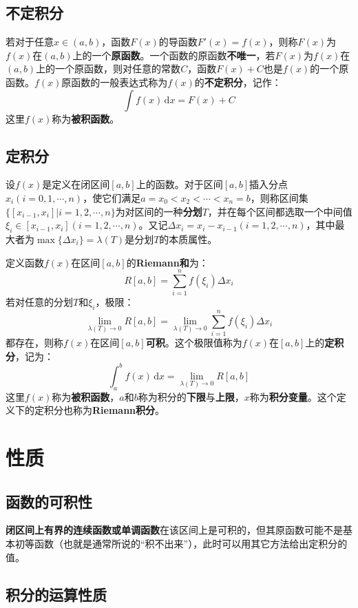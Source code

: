 \documentclass[fontset=none,openany,a4paper]{ctexbook}
\begin{document}
\subsection{不定积分}

若对于任意$x\in(a,b)$，函数$F(x)$的导函数$F'(x)=f(x)$，则称$F(x)$为$f(x)$在$(a,b)$上的一个\textbf{原函数}。一个函数的原函数\textbf{不唯一}，若$F(x)$为$f(x)$在$(a,b)$上的一个原函数，则对任意的常数$C$，函数$F(x)+C$也是$f(x)$的一个原函数。$f(x)$原函数的一般表达式称为$f(x)$的\textbf{不定积分}，记作：
\[
\int f(x)\,\mathrm{d}x = F(x)+C
\]
这里$f(x)$称为\textbf{被积函数}。

\subsection{定积分}

设$f(x)$是定义在闭区间$[a,b]$上的函数。对于区间$[a,b]$插入分点$x_i(i=0,1,\cdots,n)$，使它们满足$a = x_0 < x_2 < \cdots < x_n = b$，则称区间集$\{[x_{i-1},x_i]|i=1,2,\cdots,n\}$为对区间的一种\textbf{分划}$T$，并在每个区间都选取一个中间值$\xi_i\in[x_{i-1},x_i](i=1,2,\cdots,n)$。又记$\Delta x_i=x_i-x_{i-1}(i=1,2,\cdots,n)$，其中最大者为$\max\{\Delta x_i\}=\lambda(T)$是分划$T$的本质属性。

定义函数$f(x)$在区间$[a,b]$的\textbf{Riemann和}为：
\[
R[a,b] = \sum_{i=1}^n f(\xi_i)\Delta x_i
\]
若对任意的分划$T$和$\xi_i$，极限：
\[
\lim_{\lambda(T)\to0}R[a,b] = \lim_{\lambda(T)\to0}\sum_{i=1}^n f(\xi_i)\Delta x_i
\]
都存在，则称$f(x)$在区间$[a,b]$\textbf{可积}。这个极限值称为$f(x)$在$[a,b]$上的\textbf{定积分}，记为：
\[
\int_a^b f(x)\,\mathrm{d}x = \lim_{\lambda(T)\to0}R[a,b]
\]
这里$f(x)$称为\textbf{被积函数}，$a$和$b$称为积分的\textbf{下限}与\textbf{上限}，$x$称为\textbf{积分变量}。这个定义下的定积分也称为\textbf{Riemann积分}。

\section{性质}

\subsection{函数的可积性}

\textbf{闭区间上有界的连续函数或单调函数}在该区间上是可积的，但其原函数可能不是基本初等函数（也就是通常所说的“积不出来”），此时可以用其它方法给出定积分的值。

\subsection{积分的运算性质}
\end{document}
